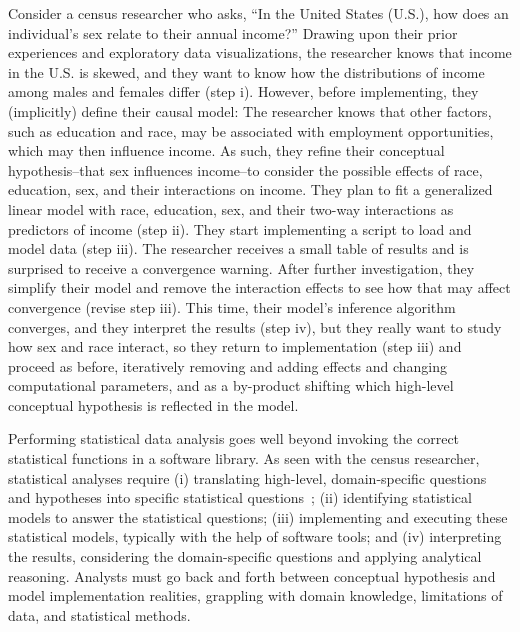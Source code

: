 Consider a census researcher who asks, ``In the United States (U.S.),
how does an individual's sex relate to their annual income?'' Drawing upon their
prior experiences and exploratory data visualizations, the researcher knows that
income in the U.S. is skewed, and they want to know how the distributions of
income among males and females differ (step i). However, before implementing,
they (implicitly) define their causal model: The researcher knows that other
factors, such as education and race, may be associated with employment
opportunities, which may then influence income. As such, they refine their
conceptual hypothesis--that sex influences income--to consider the possible
effects of race, education, sex, and their interactions on income. They plan to
fit a generalized linear model with race, education, sex, and their two-way
interactions as predictors of income (step ii). They start implementing a script
to load and model data (step iii). The researcher receives a small table of
results and is surprised to receive a convergence warning. After further
investigation, they simplify their model and remove the interaction effects to
see how that may affect convergence (revise step iii). This time, their model's
inference algorithm converges, and they interpret the results (step iv), but
they really want to study how sex and race interact, so they return to
implementation (step iii) and proceed as before, iteratively removing and adding
effects and changing computational parameters, and as a by-product shifting
which high-level conceptual hypothesis is reflected in the model.

Performing statistical data analysis goes well beyond invoking the correct
statistical functions in a software library. As seen with the census researcher,
statistical analyses require (i) translating high-level, domain-specific
questions and hypotheses into specific statistical
questions~\cite{carver2016guidelines}; (ii) identifying statistical models to
answer the statistical questions; (iii) implementing and executing these
statistical models, typically with the help of software tools; and (iv)
interpreting the results, considering the domain-specific questions and applying
analytical reasoning. Analysts must go back and forth between conceptual
hypothesis and model implementation realities, grappling with domain knowledge,
limitations of data, and statistical methods.

